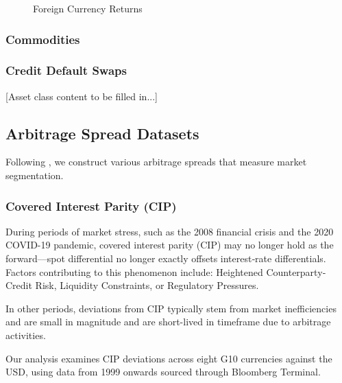 \documentclass{article}
\begin{document}
\begin{appendices}
\begin{figure}
  \caption{Foreign Currency Returns}
  \label{fig:CIP_replicate}
\end{figure}

\FloatBarrier

\subsubsection{Commodities}
\label{sec:commodities}

\subsubsection{Credit Default Swaps}
\label{sec:cds}

[Asset class content to be filled in...]

\subsection{Arbitrage Spread Datasets}
\label{sec:arbitrage}


Following \cite{Siriwardane2021}, we construct various arbitrage spreads that measure market segmentation.

\subsubsection{Covered Interest Parity (CIP)}
     

During periods of market stress, such as the 2008 financial crisis and the 2020 COVID-19
pandemic, covered interest parity (CIP) may no longer hold as the forward---spot differential 
no longer exactly offsets interest‐rate differentials. Factors contributing to this phenomenon include:
Heightened Counterparty‐Credit Risk, Liquidity Constraints, or Regulatory Pressures.

In other periods, deviations from CIP typically stem from market inefficiencies and are 
small in magnitude and are short-lived in timeframe due to arbitrage activities.

Our analysis examines CIP deviations across eight G10 currencies against the USD, 
using data from 1999 onwards sourced through Bloomberg Terminal.


\end{appendices}
\end{document}
